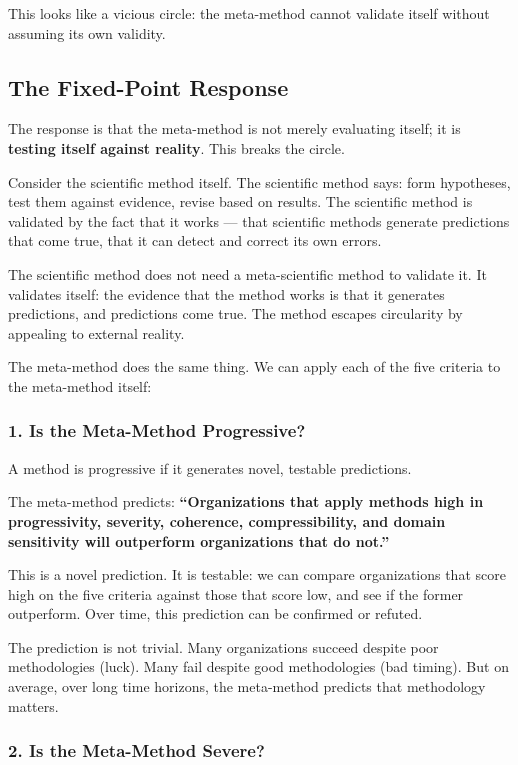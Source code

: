 \documentclass[11pt,letterpaper]{article}
\begin{document}
This looks like a vicious circle: the meta-method cannot validate itself without assuming its own validity.

\subsection*{The Fixed-Point Response}

The response is that the meta-method is not merely evaluating itself; it is \textbf{testing itself against reality}. This breaks the circle.

Consider the scientific method itself. The scientific method says: form hypotheses, test them against evidence, revise based on results. The scientific method is validated by the fact that it works — that scientific methods generate predictions that come true, that it can detect and correct its own errors.

The scientific method does not need a meta-scientific method to validate it. It validates itself: the evidence that the method works is that it generates predictions, and predictions come true. The method escapes circularity by appealing to external reality.

The meta-method does the same thing. We can apply each of the five criteria to the meta-method itself:

\subsubsection*{1. Is the Meta-Method Progressive?}

A method is progressive if it generates novel, testable predictions.

The meta-method predicts: \textbf{``Organizations that apply methods high in progressivity, severity, coherence, compressibility, and domain sensitivity will outperform organizations that do not.''}

This is a novel prediction. It is testable: we can compare organizations that score high on the five criteria against those that score low, and see if the former outperform. Over time, this prediction can be confirmed or refuted.

The prediction is not trivial. Many organizations succeed despite poor methodologies (luck). Many fail despite good methodologies (bad timing). But on average, over long time horizons, the meta-method predicts that methodology matters.

\subsubsection*{2. Is the Meta-Method Severe?}
\end{document}
